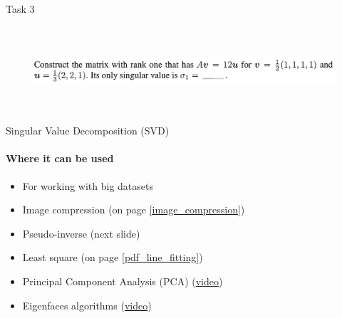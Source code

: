 \documentclass[aspectratio=169]{beamer}
\newcommand{\fbckg}[1]{\usebackgroundtemplate{\texttt{[image: \#1]}}}%
\begin{document}
\begin{frame}[t]{Task 3}
    \framesubtitle{}
    \vspace{-0.5cm}
    \begin{figure}[H]
        \centering\includegraphics[height=3cm,width=1\textwidth,keepaspectratio]{3.png}
        \label{fig:3.png}
    \end{figure}
\end{frame}


\begin{frame}[t]{Singular Value Decomposition (SVD)}
\framesubtitle{Where it can be used}
\Large
    \begin{itemize}
        \item For working with big datasets
        \item Image compression (on page \ref{image_compression})
        \item Pseudo-inverse (next slide)
        \item Least square (on page \ref{pdf_line_fitting})
        \item Principal Component Analysis (PCA) (\href{https://youtu.be/a9jdQGybYmE}{video})
        \item Eigenfaces algorithms (\href{https://youtu.be/_lY74pXWlS8}{video})
    \end{itemize}
\end{frame}

\usebackgroundtemplate{}

\fbckg{fibeamer/figs/common.png}
\end{document}
